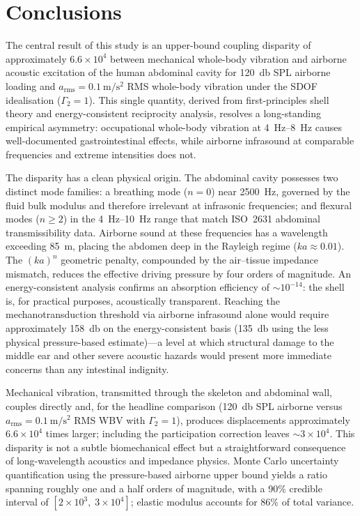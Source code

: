 \section{Conclusions}
\label{sec:conclusion}

The central result of this study is an upper-bound coupling disparity of
approximately $6.6 \times 10^4$ between mechanical whole-body vibration and
airborne acoustic excitation of the human abdominal cavity for
\SI{120}{\decibel} SPL airborne loading and
$a_\mathrm{rms} = \SI{0.1}{\metre\per\second\squared}$ RMS whole-body vibration
under the SDOF idealisation ($\Gamma_2 = 1$).  This single quantity,
derived from first-principles shell theory and energy-consistent reciprocity
analysis, resolves a long-standing empirical asymmetry: occupational
whole-body vibration at \SIrange{4}{8}{\hertz} causes well-documented
gastrointestinal effects, while airborne infrasound at comparable frequencies
and extreme intensities does not.

The disparity has a clean physical origin.  The abdominal cavity possesses
two distinct mode families: a breathing mode ($n = 0$) near
\SI{2500}{\hertz}, governed by the fluid bulk modulus and therefore irrelevant
at infrasonic frequencies; and flexural modes ($n \geq 2$) in the
\SIrange{4}{10}{\hertz} range that match ISO~2631 abdominal transmissibility
data.  Airborne sound at these frequencies has a wavelength exceeding
\SI{85}{\metre}, placing the abdomen deep in the Rayleigh regime
($ka \approx 0.01$).  The $(ka)^n$ geometric penalty, compounded by the
air--tissue impedance mismatch, reduces the effective driving pressure by
four orders of magnitude.  An energy-consistent analysis confirms an
absorption efficiency of $\sim 10^{-14}$: the shell is, for practical
purposes, acoustically transparent.  Reaching the mechanotransduction
threshold via airborne infrasound alone would require approximately
\SI{158}{\decibel} on the energy-consistent basis
(\SI{135}{\decibel} using the less physical pressure-based
estimate)---a level at which structural damage to the middle ear and other
severe acoustic hazards would present more immediate concerns than any
intestinal indignity.

Mechanical vibration, transmitted through the skeleton and abdominal wall,
couples directly and, for the headline comparison
(\SI{120}{\decibel} SPL airborne versus
$a_\mathrm{rms} = \SI{0.1}{\metre\per\second\squared}$ RMS WBV with
$\Gamma_2 = 1$), produces displacements approximately
$6.6 \times 10^4$ times larger; including the participation correction leaves
$\sim 3 \times 10^4$.  This disparity is not a subtle biomechanical effect
but a straightforward consequence of long-wavelength acoustics and impedance
physics.  Monte Carlo uncertainty quantification using the pressure-based
airborne upper bound yields a ratio spanning roughly one and a half orders of
magnitude, with a 90\% credible interval of
$[2 \times 10^3,\; 3 \times 10^4]$; elastic modulus accounts for 86\% of total
variance.

